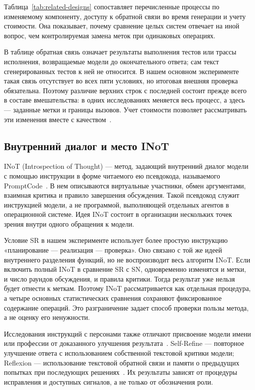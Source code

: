 Таблица~\ref{tab:related-designs} сопоставляет перечисленные процессы по изменяемому компоненту, доступу к обратной связи во время генерации и учету стоимости. Она показывает, почему сравнение целых систем отвечает на иной вопрос, чем контролируемая замена меток при одинаковых операциях.

В таблице обратная связь означает результаты выполнения тестов или трассы исполнения, возвращаемые модели до окончательного ответа; сам текст сгенерированных тестов к ней не относится. В нашем основном эксперименте такая связь отсутствует во всех пяти условиях, но итоговая внешняя проверка обязательна. Поэтому различие верхних строк с последней состоит прежде всего в составе вмешательства: в одних исследованиях меняется весь процесс, а здесь --- заданные метки и границы вызовов. Учет стоимости позволяет рассматривать эти изменения вместе с качеством~\cite{kapoor2025agents}.

\subsection{Внутренний диалог и место INoT}
INoT (Introspection of Thought) --- метод, задающий внутренний диалог модели с помощью инструкции в форме читаемого ею псевдокода, называемого PromptCode~\cite{sun2025inot}. В нем описываются виртуальные участники, обмен аргументами, взаимная критика и правило завершения обсуждения. Такой псевдокод служит инструкцией модели, а не программой, выполняющей отдельных агентов в операционной системе. Идея INoT состоит в организации нескольких точек зрения внутри одного обращения к модели.

Условие SR в нашем эксперименте использует более простую инструкцию «планирование --- реализация --- проверка». Оно связано с той же идеей внутреннего разделения функций, но не воспроизводит весь алгоритм INoT. Если включить полный INoT в сравнение SR с SN, одновременно изменятся и метки, и число раундов обсуждения, и правила критики. Тогда результат уже нельзя будет отнести к меткам. Поэтому INoT рассматривается как отдельная процедура, а четыре основных статистических сравнения сохраняют фиксированное содержание операций. Это разграничение задает способ проверки пользы метода, а не оценку его ненужности.

Исследования инструкций с персонами также отличают присвоение модели имени или профессии от доказанного улучшения результата~\cite{zheng2024personas,araujo2025personas}. Self-Refine --- повторное улучшение ответа с использованием собственной текстовой критики модели; Reflexion --- использование текстовой обратной связи и памяти о предыдущих попытках при последующих решениях~\cite{madaan2023selfrefine,shinn2023reflexion}. Их результаты зависят от процедуры исправления и доступных сигналов, а не только от обозначения роли.

